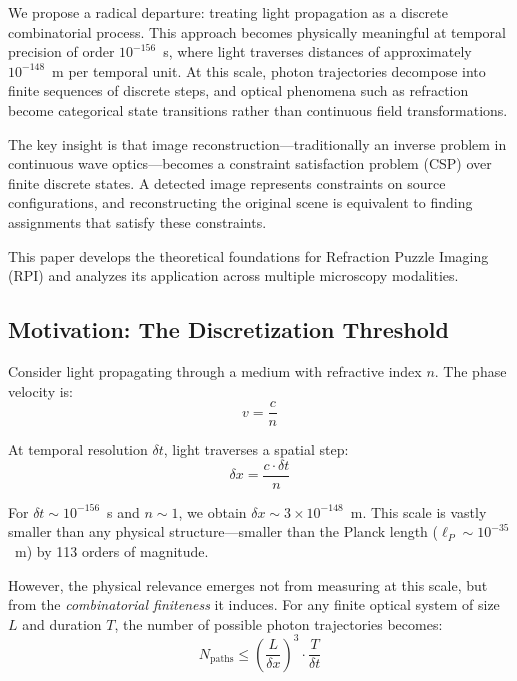 \documentclass[twocolumn,10pt,a4paper]{article}
\begin{document}
We propose a radical departure: treating light propagation as a discrete combinatorial process. This approach becomes physically meaningful at temporal precision of order $10^{-156}$~s, where light traverses distances of approximately $10^{-148}$~m per temporal unit. At this scale, photon trajectories decompose into finite sequences of discrete steps, and optical phenomena such as refraction become categorical state transitions rather than continuous field transformations.

The key insight is that image reconstruction---traditionally an inverse problem in continuous wave optics---becomes a constraint satisfaction problem (CSP) over finite discrete states. A detected image represents constraints on source configurations, and reconstructing the original scene is equivalent to finding assignments that satisfy these constraints.

This paper develops the theoretical foundations for Refraction Puzzle Imaging (RPI) and analyzes its application across multiple microscopy modalities.

\subsection{Motivation: The Discretization Threshold}

Consider light propagating through a medium with refractive index $n$. The phase velocity is:
\begin{equation}
v = \frac{c}{n}
\end{equation}

At temporal resolution $\delta t$, light traverses a spatial step:
\begin{equation}
\delta x = \frac{c \cdot \delta t}{n}
\end{equation}

For $\delta t \sim 10^{-156}$~s and $n \sim 1$, we obtain $\delta x \sim 3 \times 10^{-148}$~m. This scale is vastly smaller than any physical structure---smaller than the Planck length ($\ell_P \sim 10^{-35}$~m) by 113 orders of magnitude.

However, the physical relevance emerges not from measuring at this scale, but from the \emph{combinatorial finiteness} it induces. For any finite optical system of size $L$ and duration $T$, the number of possible photon trajectories becomes:
\begin{equation}
N_{\text{paths}} \leq \left(\frac{L}{\delta x}\right)^3 \cdot \frac{T}{\delta t}
\end{equation}
\end{document}
